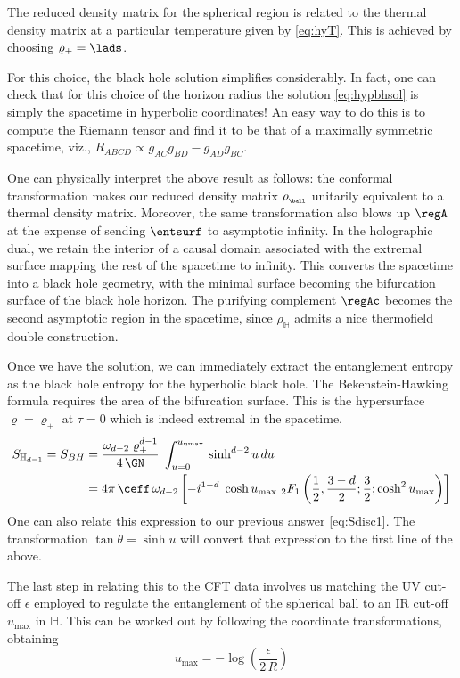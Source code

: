 \documentclass[12pt,openany]{book}
\begin{document}
The reduced density matrix for the spherical region is related to the thermal density matrix at a particular temperature given by \eqref{eq:hyT}. This is achieved by choosing $\varrho_+  = \lads$.

For this choice, the black hole solution simplifies considerably. In fact, one can check that for this choice of the horizon radius the solution \eqref{eq:hypbhsol} is simply the  spacetime in hyperbolic coordinates! An easy way to do this is to compute the Riemann tensor and find it to be that of a maximally symmetric spacetime, viz., $R_{ABCD}  \propto g_{AC} g_{BD} - g_{AD} g_{BC}$.

One can physically interpret the above result as follows: the conformal transformation makes our reduced density matrix $\rho_{_{\ball}}$ unitarily equivalent to a thermal density matrix. Moreover, the same transformation also blows up $\regA$ at the expense of sending $\entsurf$ to asymptotic infinity.  In the holographic dual, we retain the interior of a causal domain associated with the extremal surface mapping the rest of the spacetime to infinity. This converts the spacetime into a black hole geometry, with the minimal surface becoming the bifurcation surface of the black hole horizon. The purifying complement $\regAc$ becomes the second asymptotic region in the spacetime, since $\rho_{\mathbb{H}}$ admits a nice thermofield double construction.

Once we have the solution, we can immediately extract the entanglement entropy as the black hole entropy for the hyperbolic black hole. The Bekenstein-Hawking formula requires the area of the bifurcation surface. This is the hypersurface $\varrho = \varrho_+$ at $\tau =0$ which is indeed extremal in the spacetime.
%
\begin{equation}
\begin{split}
S_{\mathbb{H}_{d-1}} = S_{BH} &= \frac{\omega_{d-2} \; \varrho_+^{d-1}}{4\, \GN}\; \int_{u=0}^{u_\text{umax}} \, \sinh^{d-2} u \, du   \\
& = 4\pi\,\ceff\, \omega_{d-2} \left[-i^{1-d}\; \cosh u_\text{max} \  _2F_1\left(\frac{1}{2},\frac{3-d}{2};\frac{3}{2};\cosh ^2u_\text{max}\right) \right]
\end{split}
\label{eq:}
\end{equation}
%
One can also relate this expression to our previous answer \eqref{eq:Sdisc1}. The transformation $\tan\theta = \sinh u$ will convert that expression to the first line of the above.

The last step in relating this to the CFT data involves us matching the UV cut-off $\epsilon$ employed to regulate the entanglement of the spherical ball to an IR cut-off $u_\text{max}$ in $\mathbb{H}$.  This can be worked out by following the coordinate transformations, obtaining
%
\begin{equation}
u_\text{max} = -\log\left(\frac{\epsilon}{2\,R}\right)
\label{eq:uvirH}
\end{equation}
%
\end{document}
